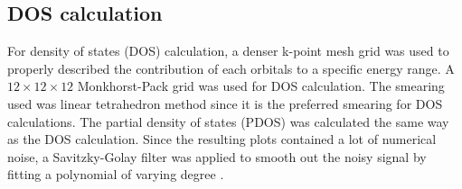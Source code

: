         \subsection{DOS calculation}
        For density of states (DOS) calculation, a denser k-point mesh grid was used to properly described the contribution of each orbitals to a  specific energy range. A $12 \times 12 \times 12$ Monkhorst-Pack grid was used for DOS calculation. The smearing used was linear tetrahedron method since it is the preferred smearing for DOS calculations. The partial density of states (PDOS) was calculated the same way as the  DOS calculation. Since the resulting plots contained a lot of numerical noise, a Savitzky-Golay filter was applied to smooth out the noisy signal by fitting a polynomial of varying degree \citep{Savitzky1964,Luo2005}.

